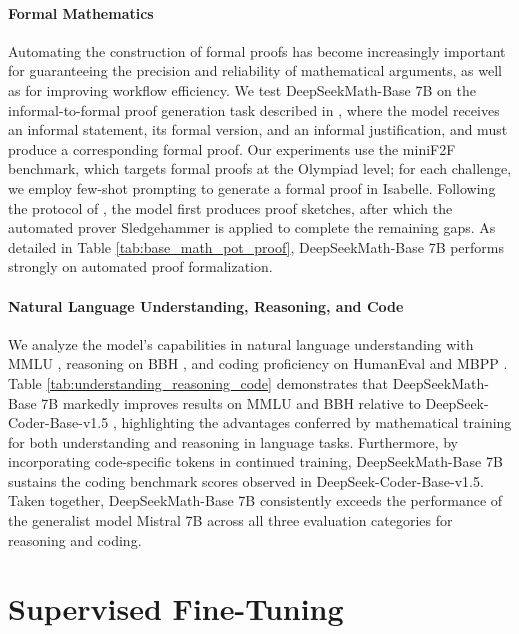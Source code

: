 \paragraph{Formal Mathematics}

Automating the construction of formal proofs has become increasingly important for guaranteeing the precision and reliability of mathematical arguments, as well as for improving workflow efficiency. We test DeepSeekMath-Base 7B on the informal-to-formal proof generation task described in \citep{dsp_proof}, where the model receives an informal statement, its formal version, and an informal justification, and must produce a corresponding formal proof. Our experiments use the miniF2F \citep{minif2f} benchmark, which targets formal proofs at the Olympiad level; for each challenge, we employ few-shot prompting to generate a formal proof in Isabelle. Following the protocol of \cite{dsp_proof}, the model first produces proof sketches, after which the automated prover Sledgehammer \citep{sledgehammer} is applied to complete the remaining gaps. As detailed in Table \ref{tab:base_math_pot_proof}, DeepSeekMath-Base 7B performs strongly on automated proof formalization.

\paragraph{Natural Language Understanding, Reasoning, and Code}

We analyze the model’s capabilities in natural language understanding with MMLU \citep{mmlu}, reasoning on BBH \citep{bbh}, and coding proficiency on HumanEval \citep{codex} and MBPP \citep{mbpp}. Table \ref{tab:understanding_reasoning_code} demonstrates that DeepSeekMath-Base 7B markedly improves results on MMLU and BBH relative to DeepSeek-Coder-Base-v1.5 \citep{deepseek-coder}, highlighting the advantages conferred by mathematical training for both understanding and reasoning in language tasks. Furthermore, by incorporating code-specific tokens in continued training, DeepSeekMath-Base 7B sustains the coding benchmark scores observed in DeepSeek-Coder-Base-v1.5. Taken together, DeepSeekMath-Base 7B consistently exceeds the performance of the generalist model Mistral 7B \citep{mistral} across all three evaluation categories for reasoning and coding.

\section{Supervised Fine-Tuning}

